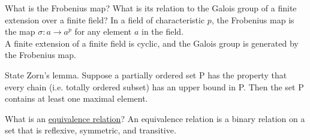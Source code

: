 \documentclass[avery5371,grid]{flashcards}
\begin{document}
\begin{flashcard}[Fields]{What is the Frobenius map? What is its relation to the Galois group of a finite extension over a finite field?}
 In a field of characteristic $p$, the Frobenius map is the map $\sigma: a \to a^p$ for any element $a$ in the field. \\
 
 A finite extension of a finite field is cyclic, and the Galois group is generated by the Frobenius map.
\end{flashcard}








\begin{flashcard}[Miscellaneous]{State Zorn's lemma.}
 Suppose a partially ordered set P has the property that every chain (i.e. totally ordered subset) has an upper bound in P. Then the set P contains at least one maximal element.
\end{flashcard}

\begin{flashcard}[Miscellaneous]{What is an \underline{equivalence relation}?}
 An equivalence relation is a binary relation on a set that is reflexive, symmetric, and transitive.
\end{flashcard}
\end{document}
